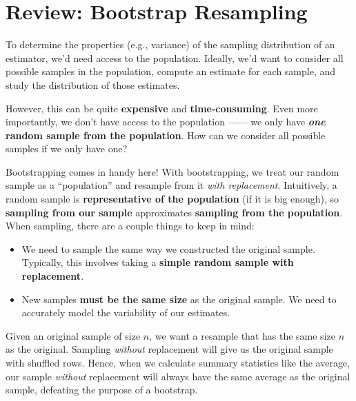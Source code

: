 \documentclass[
  letterpaper,
  DIV=11,
  numbers=noendperiod]{scrreprt}
\providecommand{\tightlist}{%
  \setlength{\itemsep}{0pt}\setlength{\parskip}{0pt}}\usepackage{longtable,booktabs,array}
\begin{document}
\section{Review: Bootstrap
Resampling}\label{review-bootstrap-resampling}

To determine the properties (e.g., variance) of the sampling
distribution of an estimator, we'd need access to the population.
Ideally, we'd want to consider all possible samples in the population,
compute an estimate for each sample, and study the distribution of those
estimates.

However, this can be quite \textbf{expensive} and
\textbf{time-consuming}. Even more importantly, we don't have access to
the population ------ we only have \textbf{\emph{one} random sample from
the population}. How can we consider all possible samples if we only
have one?

Bootstrapping comes in handy here! With bootstrapping, we treat our
random sample as a ``population'' and resample from it \emph{with
replacement}. Intuitively, a random sample is \textbf{representative of
the population} (if it is big enough), so \textbf{sampling from our
sample} approximates \textbf{sampling from the population}. When
sampling, there are a couple things to keep in mind:

\begin{itemize}
\tightlist
\item
  We need to sample the same way we constructed the original sample.
  Typically, this involves taking a \textbf{simple random sample with
  replacement}.
\item
  New samples \textbf{must be the same size} as the original sample. We
  need to accurately model the variability of our estimates.
\end{itemize}

\begin{tcolorbox}[enhanced jigsaw, colback=white, arc=.35mm, toprule=.15mm, colframe=quarto-callout-warning-color-frame, coltitle=black, opacitybacktitle=0.6, breakable, titlerule=0mm, leftrule=.75mm, left=2mm, opacityback=0, bottomtitle=1mm, rightrule=.15mm, colbacktitle=quarto-callout-warning-color!10!white, bottomrule=.15mm, title=\textcolor{quarto-callout-warning-color}{\faExclamationTriangle}\hspace{0.5em}{Why must we resample \emph{with replacement}?}, toptitle=1mm]

Given an original sample of size \(n\), we want a resample that has the
same size \(n\) as the original. Sampling \emph{without} replacement
will give us the original sample with shuffled rows. Hence, when we
calculate summary statistics like the average, our sample \emph{without}
replacement will always have the same average as the original sample,
defeating the purpose of a bootstrap.

\end{tcolorbox}
\end{document}
